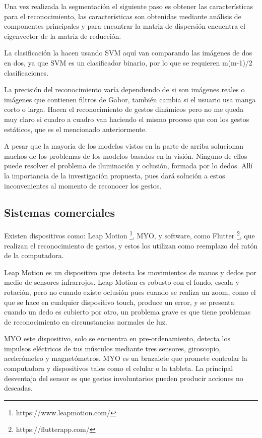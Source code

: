 Una vez realizada la segmentación el siguiente paso es obtener las características para el reconocimiento, las características son obtenidas mediante análisis de componentes principales y para encontrar la matriz de dispersión encuentra el eigenvector de la matriz de reducción. 

La clasificación la hacen usando SVM aquí van comparando las imágenes de dos en dos, ya que SVM es un clasificador binario, por lo que se requieren m(m-1)/2 clasificaciones.   

La precisión del reconocimiento varía dependiendo de si son imágenes reales o imágenes que contienen filtros de Gabor, también cambia si el usuario usa manga corto o larga. Hacen el reconocimiento de gestos dinámicos pero no me queda muy claro si cuadro a cuadro van haciendo el mismo proceso que con los gestos estáticos, que es el mencionado anteriormente.  
 


A pesar que la mayoría de los modelos vistos en la parte de arriba solucionan muchos de los problemas de los modelos basados en la visi\'on. Ninguno de ellos puede resolver el problema de iluminaci\'on y oclusi\'on, formada por lo dedos. All\'i la importancia de la investigaci\'on propuesta, pues dar\'a soluci\'on a estos inconvenientes al momento de reconocer los gestos.
 
\subsection{Sistemas comerciales}

Existen dispositivos como: Leap Motion \footnote{https://www.leapmotion.com/}, MYO, y software, como Flutter \footnote{https://flutterapp.com/}, que realizan el reconocimiento de gestos, y estos los utilizan como reemplazo del rat\'on de la computadora. 
 
Leap Motion es un dispositivo que detecta los movimientos de manos y dedos por medio de sensores infrarrojos. Leap Motion es robusto con el fondo, escala y rotaci\'on,  pero no cuando existe oclusi\'on pues cuando se realiza un zoom, como el que se hace en cualquier dispositivo touch, produce un error, y se presenta cuando un dedo es cubierto por otro, un problema grave es que tiene problemas de reconocimiento en circunstancias normales de luz.  

MYO este dispositivo, solo se encuentra en pre-ordenamiento, detecta los impulsos el\'ectricos de tus m\'usculos mediante tres sensores, giroscopio, aceler\'ometro y magnet\'ometros. MYO es un brazalete  que promete controlar la computadora y dispositivos tales como el celular o la tableta. La principal desventaja del sensor es que gestos involuntarios pueden producir acciones no deseadas.

